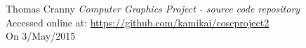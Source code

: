 \begin{thebibliography}{9}

    Thomas Cranny
    \textit{Computer Graphics Project - source code repository}\\
    Accessed online at:
    \href{https://github.com/kamikai/cosc_project2}{https://github.com/kamikai/cosc{\textunderscore}project2}\\
    On 3/May/2015

\end{thebibliography}